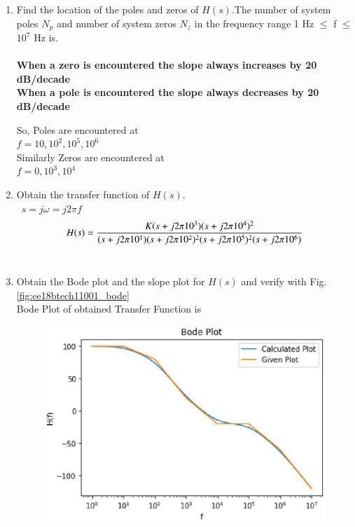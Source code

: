 \begin{enumerate}[label=\thesection.\arabic*.,ref=\thesection.\theenumi]
\item Find the location of the poles and zeros of $H(s).$The number of system poles $N_{p}$ and number of system zeros $N_{z}$ in the frequency range 1 Hz $\leq$ f $\leq$ $10^{7}$ Hz is.
\\
\solution\\
\textbf{When a zero is encountered the slope always increases by 20 dB/decade}\\
\textbf{When a pole is encountered the slope always decreases by 20 dB/decade}

So, Poles are encountered at\\ $f = 10,10^2,10^5,10^6$\\
Similarly Zeros are encountered at\\ $f = 0,10^3,10^4$


\item Obtain the transfer function of $H(s)$.
\\
\solution\
$ s = j\omega = j2\pi f$
\begin{align}
\begin{small}
	H(s) = \dfrac{K(s+j2\pi 10^{3})(s+j2\pi 10^{4})^{2}}{(s+j2\pi 10^{1})(s+j2\pi 10^{2})^{2}(s+j2\pi 10^{5})^{2}(s+j2\pi 10^{6})}
\end{small}
\end{align}\\


\item Obtain the Bode plot and the slope plot for $H(s)$ and verify with  Fig. \ref{fig:ee18btech11001_bode}
\\
\solution
Bode Plot of obtained Transfer Function is 
\begin{figure}[htp]
    \centering
    \includegraphics[width=\columnwidth]{./figs/ee18btech11001/ee18btech11001_2.eps}
    \caption{}
    \label{fig:bode}
\end{figure}

\end{enumerate}
